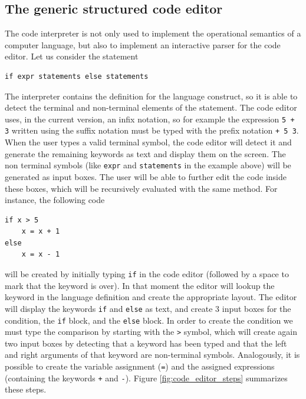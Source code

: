 \subsection{The generic structured code editor}
The code interpreter is not only used to implement the operational semantics of a computer language, but also to implement an interactive parser for the code editor. Let us consider the statement

\begin{lstlisting}
if expr statements else statements
\end{lstlisting}

The interpreter contains the definition for the language construct, so it is able to detect the terminal and non-terminal elements of the statement. The code editor uses, in the current version, an infix notation, so for example the expression \texttt{5 + 3} written using the suffix notation must be typed with the prefix notation \texttt{+ 5 3}. When the user types a valid terminal symbol, the code editor will detect it and generate the remaining keywords as text and display them on the screen. The non terminal symbols (like \texttt{expr} and \texttt{statements} in the example above) will be generated as input boxes. The user will be able to further edit the code inside these boxes, which will be recursively evaluated with the same method. For instance, the following code

\begin{lstlisting}
if x > 5
	x = x + 1
else
	x = x - 1
\end{lstlisting}

\noindent
will be created by initially typing \texttt{if} in the code editor (followed by a space to mark that the keyword is over). In that moment the editor will lookup the keyword in the language definition and create the appropriate layout. The editor will display the keywords \texttt{if} and \texttt{else} as text, and create 3 input boxes for the condition, the \texttt{if} block, and the \texttt{else} block. In order to create the condition we must type the comparison by starting with the \texttt{>} symbol, which will create again two input boxes by detecting that a keyword has been typed and that the left and right arguments of that keyword are non-terminal symbols. Analogously, it is possible to create the variable assignment (\texttt{=}) and the assigned expressions (containing the keywords \texttt{+} and \texttt{-}). Figure \ref{fig:code_editor_steps} summarizes these steps.

